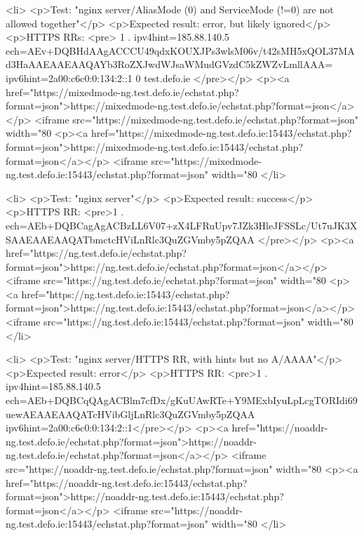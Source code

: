 <li>
<p>Test: "nginx server/AliasMode (0) and ServiceMode (!=0) are not allowed together"</p>
<p>Expected result: error, but likely ignored</p>
<p>HTTPS RRs: <pre>
1 . ipv4hint=185.88.140.5 ech=AEv+DQBHdAAgACCCU49qdxKOUXJPs3wlsM06v/t42sMH5xQOL37MAd3HaAAEAAEAAQAYb3RoZXJwdWJsaWMudGVzdC5kZWZvLmllAAA= ipv6hint=2a00:c6c0:0:134:2::1
0 test.defo.ie
</pre></p>
<p><a href="https://mixedmode-ng.test.defo.ie/echstat.php?format=json">https://mixedmode-ng.test.defo.ie/echstat.php?format=json</a></p>
<iframe src="https://mixedmode-ng.test.defo.ie/echstat.php?format=json" width="80%
<p><a href="https://mixedmode-ng.test.defo.ie:15443/echstat.php?format=json">https://mixedmode-ng.test.defo.ie:15443/echstat.php?format=json</a></p>
<iframe src="https://mixedmode-ng.test.defo.ie:15443/echstat.php?format=json" width="80%
</li>

<li>
<p>Test: "nginx server"</p>
<p>Expected result: success</p>
<p>HTTPS RR: <pre>1 . ech=AEb+DQBCagAgACBzLL6V07+zX4LFRuUpv7JZk3HleJFSSLc/Ut7uJK3XSAAEAAEAAQATbmctcHViLnRlc3QuZGVmby5pZQAA
</pre></p>
<p><a href="https://ng.test.defo.ie/echstat.php?format=json">https://ng.test.defo.ie/echstat.php?format=json</a></p>
<iframe src="https://ng.test.defo.ie/echstat.php?format=json" width="80%
<p><a href="https://ng.test.defo.ie:15443/echstat.php?format=json">https://ng.test.defo.ie:15443/echstat.php?format=json</a></p>
<iframe src="https://ng.test.defo.ie:15443/echstat.php?format=json" width="80%
</li>

<li>
<p>Test: "nginx server/HTTPS RR, with hints but no A/AAAA"</p>
<p>Expected result: error</p>
<p>HTTPS RR: <pre>1 . ipv4hint=185.88.140.5 ech=AEb+DQBCqQAgACBlm7cfDx/gKuUAwRTe+Y9MExbIyuLpLcgTORIdi69uewAEAAEAAQATcHVibGljLnRlc3QuZGVmby5pZQAA ipv6hint=2a00:c6c0:0:134:2::1</pre></p>
<p><a href="https://noaddr-ng.test.defo.ie/echstat.php?format=json">https://noaddr-ng.test.defo.ie/echstat.php?format=json</a></p>
<iframe src="https://noaddr-ng.test.defo.ie/echstat.php?format=json" width="80%
<p><a href="https://noaddr-ng.test.defo.ie:15443/echstat.php?format=json">https://noaddr-ng.test.defo.ie:15443/echstat.php?format=json</a></p>
<iframe src="https://noaddr-ng.test.defo.ie:15443/echstat.php?format=json" width="80%
</li>

